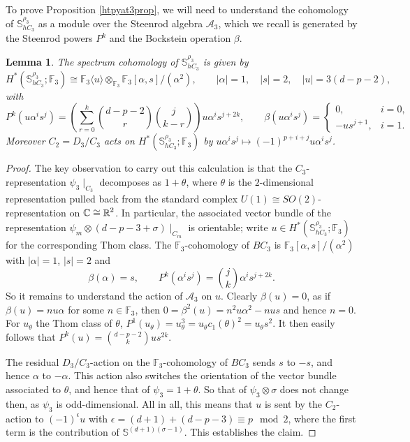 \documentclass[a4paper, oneside]{amsart}
\newcommand{\1}{\mathds{1}}
\newtheorem{lem}[thm]{Lemma}
\theoremstyle{remark}
\theoremstyle{definition}
\newcommand{\R}{{\scaleobj{0.97}{\mathbb{R}}}}
\newcommand{\C}{\mathbb{C}}
\newcommand{\s}{\mathbb{S}}
\numberwithin{equation}{section}
\begin{document}
To prove Proposition \ref{htpyat3prop}, we will need to understand the cohomology of $\s^{\rho_3}_{hC_3}$ as a module over the Steenrod algebra $\mathcal A_3$, which we recall is generated by the Steenrod powers $P^k$ and the Bockstein operation $\beta$. 
\begin{lem}\label{E3moduleoverA3lem}
    The spectrum cohomology of $\s^{\rho_3}_{hC_3}$ is given by
    $$
H^*(\s^{\rho_3}_{hC_3}; \mathbb{F}_3)\cong \mathbb{F}_3\langle u\rangle\otimes_{\mathbb{F}_3}\mathbb{F}_3[\alpha,s]/(\alpha^2), \qquad |\alpha|=1, \quad |s|=2, \quad |u|=3(d-p-2),
    $$
with
    $$
P^k(u\alpha^{i}s^j)=\left(\sum_{r=0}^k{d-p-2\choose r}{j\choose k-r}\right)u\alpha^{i}s^{j+2k}, \qquad \beta(u\alpha^{i}s^j)=\left\{\begin{array}{cl}
    0, & i=0, \\
    -us^{j+1}, & i=1.
\end{array}\right.
    $$
Moreover $C_2=D_3/C_3$ acts on $H^*(\s^{\rho_3}_{hC_3};\mathbb{F}_3)$ by
$
u\alpha^{i}s^j\mapsto (-1)^{p+i+j}u\alpha^{i}s^j
$.
\end{lem}

\begin{proof}
    The key observation to carry out this calculation is that the $C_3$-representation $\psi_3\mid_{C_3}$ decomposes as $1+\theta$, where $\theta$ is the $2$-dimensional representation pulled back from the standard complex $U(1)\cong SO(2)$-representation on $\C\cong\R^2$. In particular, the associated vector bundle of the representation $\psi_m\otimes (d-p-3+\sigma)\mid_{C_m}$ is orientable; write $u\in H^*(\s^{\rho_3}_{hC_3};\mathbb{F}_3)$ for the corresponding Thom class. The $\mathbb{F}_3$-cohomology of $BC_3$ is $\mathbb{F}_3[\alpha,s]/(\alpha^2)$ with $|\alpha|=1$, $|s|=2$ and
    $$
\beta(\alpha)=s, \qquad P^k(\alpha^{i}s^j)={j\choose k}\alpha^{i}s^{j+2k}.
    $$
So it remains to understand the action of $\mathcal A_3$ on $u$. Clearly $\beta(u)=0$, as if $\beta(u)=nu\alpha$ for some $n\in\mathbb{F}_3$, then  $0=\beta^2(u)=n^2u\alpha^2-nus$ and hence $n=0$. For $u_{\theta}$ the Thom class of $\theta$, 
$
P^1(u_{\theta})=u_{\theta}^3=u_{\theta}c_1(\theta)^2=u_{\theta}s^2
$. It then easily follows that $P^k(u)={d-p-2\choose k}us^{2k}$.

The residual $D_3/C_3$-action on the $\mathbb{F}_3$-cohomology of $BC_3$ sends $s$ to $-s$, and hence $\alpha$ to $-\alpha$. This action also switches the orientation of the vector bundle associated to $\theta$, and hence that of $\psi_3=1+\theta$. So that of $\psi_3\otimes\sigma$ does not change then, as $\psi_3$ is odd-dimensional. All in all, this means that $u$ is sent by the $C_2$-action to $(-1)^\epsilon u$ with
$
\epsilon=(d+1)+(d-p-3)\equiv p\mod 2
$, where the first term is the contribution of $\s^{(d+1)(\sigma-1)}$. This establishes the claim. 
\end{proof}
\end{document}
